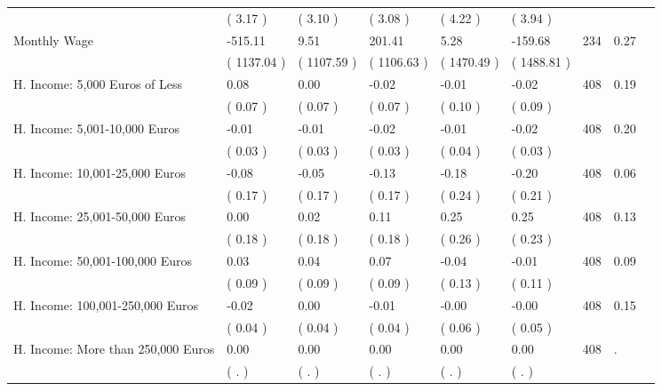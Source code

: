 \begin{tabular}{L{6.2cm} C{1.8cm} C{1.8cm} C{1.8cm} C{1.8cm} C{1.8cm} C{1.8cm} C{0.3cm} C{0.3cm}}
 & (     3.17 ) & (     3.10 ) & (     3.08 ) & (     4.22 ) & (     3.94 )  & \\
Monthly Wage &   -515.11 &      9.51 &    201.41 &      5.28 &   -159.68  & 234 &       0.27 \\ 
 & (  1137.04 ) & (  1107.59 ) & (  1106.63 ) & (  1470.49 ) & (  1488.81 )  & \\
H. Income: 5,000 Euros of Less &      0.08 &      0.00 &     -0.02 &     -0.01 &     -0.02  & 408 &       0.19 \\ 
 & (     0.07 ) & (     0.07 ) & (     0.07 ) & (     0.10 ) & (     0.09 )  & \\
H. Income: 5,001-10,000 Euros &     -0.01 &     -0.01 &     -0.02 &     -0.01 &     -0.02  & 408 &       0.20 \\ 
 & (     0.03 ) & (     0.03 ) & (     0.03 ) & (     0.04 ) & (     0.03 )  & \\
H. Income: 10,001-25,000 Euros &     -0.08 &     -0.05 &     -0.13 &     -0.18 &     -0.20  & 408 &       0.06 \\ 
 & (     0.17 ) & (     0.17 ) & (     0.17 ) & (     0.24 ) & (     0.21 )  & \\
H. Income: 25,001-50,000 Euros &      0.00 &      0.02 &      0.11 &      0.25 &      0.25  & 408 &       0.13 \\ 
 & (     0.18 ) & (     0.18 ) & (     0.18 ) & (     0.26 ) & (     0.23 )  & \\
H. Income: 50,001-100,000 Euros &      0.03 &      0.04 &      0.07 &     -0.04 &     -0.01  & 408 &       0.09 \\ 
 & (     0.09 ) & (     0.09 ) & (     0.09 ) & (     0.13 ) & (     0.11 )  & \\
H. Income: 100,001-250,000 Euros &     -0.02 &      0.00 &     -0.01 &     -0.00 &     -0.00  & 408 &       0.15 \\ 
 & (     0.04 ) & (     0.04 ) & (     0.04 ) & (     0.06 ) & (     0.05 )  & \\
H. Income: More than 250,000 Euros &      0.00 &      0.00 &      0.00 &      0.00 &      0.00  & 408 &          . \\ 
 & (        . ) & (        . ) & (        . ) & (        . ) & (        . )  & \\
\bottomrule
\end{tabular}

